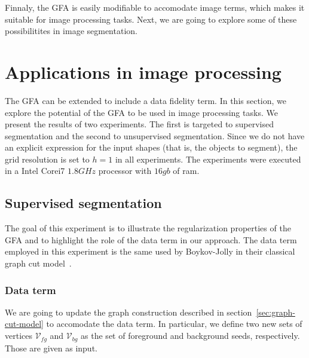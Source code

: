 \documentclass[smallextended]{svjour3}
\begin{document}
Finnaly, the GFA is easily modifiable to accomodate image terms, which makes it suitable for image processing tasks. Next, we are going to explore some of these possibilitites in image segmentation.
%
%
\section{Applications in image processing}

The GFA can be extended to include a data fidelity term. In this section, we explore the potential of the GFA to be used in image processing tasks. We present the results of two experiments. The first is targeted to supervised segmentation and the second to unsupervised segmentation. Since we do not have an explicit expression for the input shapes (that is, the objects to segment), the grid resolution is set to $h=1$ in all experiments. The experiments were executed in a Intel Corei7 $1.8GHz$ processor with $16gb$ of ram.


\subsection{Supervised segmentation}

The goal of this experiment is to illustrate the regularization properties of the GFA and to highlight the role of the data term in our approach. The data term employed in this experiment is the same used by Boykov-Jolly in their classical graph cut model~\cite{boykov01graphcut}. 

\subsubsection{Data term}
We are going to update the graph construction described in section~\ref{sec:graph-cut-model} to accomodate the data term. In particular, we define two new sets of vertices $\mathcal{V}_{fg}$ and $\mathcal{V}_{bg}$ as the set of foreground and background seeds, respectively. Those are given as input.
\end{document}
